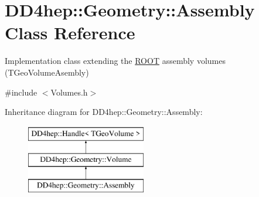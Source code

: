 \hypertarget{class_d_d4hep_1_1_geometry_1_1_assembly}{}\section{D\+D4hep\+:\+:Geometry\+:\+:Assembly Class Reference}
\label{class_d_d4hep_1_1_geometry_1_1_assembly}


Implementation class extending the \hyperlink{namespace_r_o_o_t}{R\+O\+OT} assembly volumes (T\+Geo\+Volume\+Asembly)  




{\ttfamily \#include $<$Volumes.\+h$>$}

Inheritance diagram for D\+D4hep\+:\+:Geometry\+:\+:Assembly\+:\begin{figure}[H]
\begin{center}
\leavevmode
\includegraphics[height=3.000000cm]{class_d_d4hep_1_1_geometry_1_1_assembly}
\end{center}
\end{figure}
